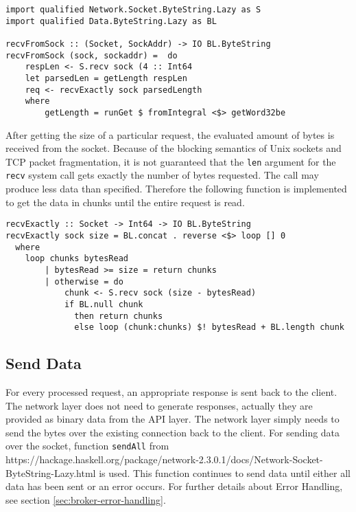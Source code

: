 \begin{lstlisting}[caption={Receiving a request from socket}]
import qualified Network.Socket.ByteString.Lazy as S 
import qualified Data.ByteString.Lazy as BL

recvFromSock :: (Socket, SockAddr) -> IO BL.ByteString
recvFromSock (sock, sockaddr) =  do 
    respLen <- S.recv sock (4 :: Int64
    let parsedLen = getLength respLen
    req <- recvExactly sock parsedLength 
    where
        getLength = runGet $ fromIntegral <$> getWord32be
\end{lstlisting}

After getting the size of a particular request, the evaluated amount of bytes
is received from the socket. Because of the blocking semantics of Unix sockets
and TCP packet fragmentation, it is not guaranteed that the \lstinline{len} argument for the
\lstinline{recv} system call gets exactly the number of bytes requested. The call
may produce less data than specified. Therefore the following
function is implemented to get the data in chunks until the entire request is
read.

\begin{lstlisting}[caption={Receive exactly amount of bytes from socket}]
recvExactly :: Socket -> Int64 -> IO BL.ByteString 
recvExactly sock size = BL.concat . reverse <$> loop [] 0 
  where
    loop chunks bytesRead
        | bytesRead >= size = return chunks
        | otherwise = do  
            chunk <- S.recv sock (size - bytesRead)
            if BL.null chunk 
              then return chunks 
              else loop (chunk:chunks) $! bytesRead + BL.length chunk 
\end{lstlisting}

\newpage
\subsection{Send Data}
\label{sec:impl-broker-socket-send}

For every processed request, an appropriate response is sent back to the
client. The network layer does not need to generate responses, actually they
are provided as binary data from the API layer. The network layer
simply needs to send the bytes over the existing connection back
to the client. For sending data over the socket, function \lstinline{sendAll} from
{https://hackage.haskell.org/package/network-2.3.0.1/docs/Network-Socket-ByteString-Lazy.html}
is used. This function continues to send data until either all data has been
sent or an error occurs. For further details about Error Handling, see section
\ref{sec:broker-error-handling}.

